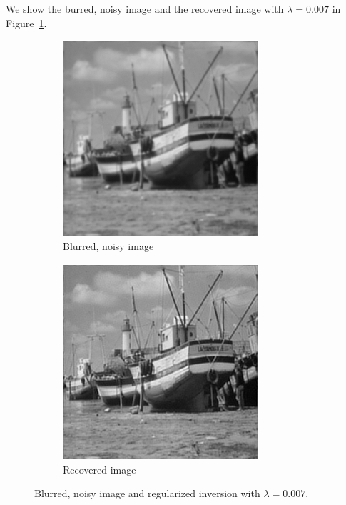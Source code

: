 \documentclass[12pt]{article}
\begin{document}
We show the burred, noisy image and the recovered image with $\lambda = 0.007$
in Figure~\ref{fig:images}.
\begin{figure}[!ht]
  \centering
  \begin{subfigure}{0.49\textwidth}
    \centering
    \includegraphics[width=0.8\textwidth]{figures/boat_blurred}
    \caption{Blurred, noisy image}
  \end{subfigure}
  \begin{subfigure}{0.49\textwidth}
    \centering
    \includegraphics[width=0.8\textwidth]{figures/boat_deblurred}
    \caption{Recovered image}
  \end{subfigure}
  \caption{Blurred, noisy image and regularized inversion with $\lambda = 0.007$.}
  \label{fig:images}
\end{figure}
\end{document}
